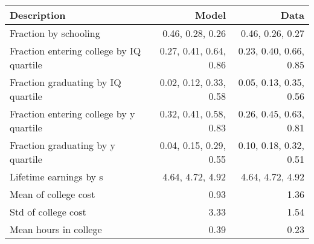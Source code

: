 \begin{tabular}{lrr}
\hline
Description & Model  & Data  \\
\hline
Fraction by schooling & 0.46, 0.28, 0.26  & 0.46, 0.26, 0.27  \\
Fraction entering college by IQ quartile & 0.27, 0.41, 0.64, 0.86  & 0.23, 0.40, 0.66, 0.85  \\
Fraction graduating by IQ quartile & 0.02, 0.12, 0.33, 0.58  & 0.05, 0.13, 0.35, 0.56  \\
Fraction entering college by y quartile & 0.32, 0.41, 0.58, 0.83  & 0.26, 0.45, 0.63, 0.81  \\
Fraction graduating by y quartile & 0.04, 0.15, 0.29, 0.55  & 0.10, 0.18, 0.32, 0.51  \\
Lifetime earnings by s & 4.64, 4.72, 4.92  & 4.64, 4.72, 4.92  \\
Mean of college cost & 0.93  & 1.36  \\
Std of college cost & 3.33  & 1.54  \\
Mean hours in college & 0.39  & 0.23  \\
\hline
\end{tabular}%
